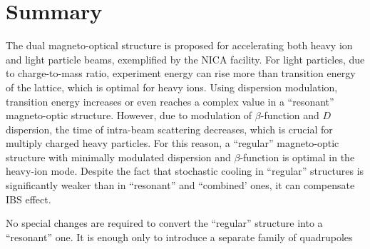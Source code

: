 \documentclass[submitting]{nst}
\begin{document}
\section{Summary} \label{sec.IV}

\par The dual magneto-optical structure is proposed for accelerating both heavy ion and light particle beams, exemplified by the NICA facility. For light particles, due to charge-to-mass ratio, experiment energy can rise more than transition energy of the lattice, which is optimal for heavy ions. Using dispersion modulation, transition energy increases or even reaches a complex value in a “resonant” magneto-optic structure. However, due to modulation of $\beta$-function and $D$ dispersion, the time of intra-beam scattering decreases, which is crucial for multiply charged heavy particles. For this reason, a “regular” magneto-optic structure with minimally modulated dispersion and $\beta$-function is optimal in the heavy-ion mode. Despite the fact that stochastic cooling in “regular” structures is significantly weaker than in “resonant” and “combined’ ones, it can compensate IBS effect.
\par No special changes are required to convert the “regular” structure into a “resonant” one. It is enough only to introduce a separate family of quadrupoles
\end{document}
